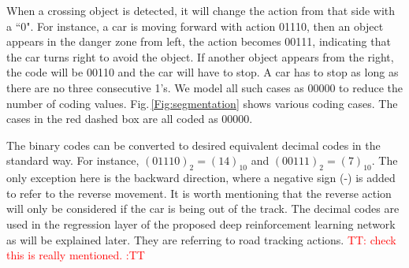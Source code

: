 \documentclass{svproc}
\renewcommand{\tt}[1]{\textcolor{red} {TT: #1 :TT} }
\begin{document}
When a crossing object is detected, it will change the action from that side with a ``0". For instance, a car is moving forward with action 01110, then an object appears in the danger zone from left, the action becomes 00111, indicating that the car turns right to avoid the object. If another object appears from the right, the code will be 00110 and the car will have to stop. A car has to stop as long as there are no three consecutive 1's. We model all such cases as 00000 to reduce the number of coding values. Fig.\,\ref{Fig:segmentation} shows various coding cases. The cases in the red dashed box are all coded as 00000.

The binary codes can be converted to desired equivalent decimal codes in the standard way. For instance, $(01110)_2=(14)_{10}$ and $(00111)_2=(7)_{10}$. The only exception here is the backward direction, where a negative sign (-) is added to refer to the reverse movement. It is worth mentioning that the reverse action will only be considered if the car is being out of the track. The decimal codes are used in the regression layer of the proposed deep reinforcement learning network as will be explained later. They are referring to road tracking actions. \tt{check this is really mentioned.}

\end{document}
